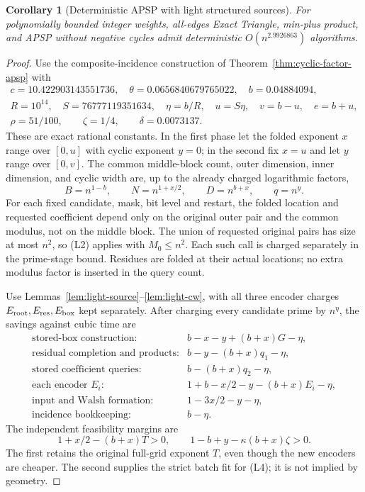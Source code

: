 \documentclass[11pt]{article}
\newtheorem{corollary}[theorem]{Corollary}
\begin{document}
\begin{corollary}[Deterministic APSP with light structured sources]
\label{cor:light-source-apsp}
For polynomially bounded integer weights, all-edges Exact Triangle,
min-plus product, and APSP without negative cycles admit deterministic
$O(n^{2.9926863})$ algorithms.
\end{corollary}
\begin{proof}
Use the composite-incidence construction of
Theorem~\ref{thm:cyclic-factor-apsp} with
\[
\begin{gathered}
 c=10.422903143551736,\quad \theta=0.0656840679765022,\quad
 b=0.04884094,\\
 R=10^{14},\quad S=76777119351634,\quad
 \eta=b/R,\quad u=S\eta,\quad v=b-u,\quad e=b+u,\\
 \rho=51/100,\qquad \zeta=1/4,\qquad \delta=0.0073137.
\end{gathered}
\]
These are exact rational constants. In the first phase let the
folded exponent $x$ range over $[0,u]$ with cyclic exponent $y=0$;
in the second fix $x=u$ and let $y$ range over $[0,v]$.
The common middle-block count, outer dimension, inner dimension,
and cyclic width are, up to the already charged logarithmic factors,
\[
 B=n^{1-b},\qquad N=n^{1+x/2},\qquad D=n^{b+x},\qquad q=n^y.
\]
For each fixed candidate, mask, bit level and restart, the folded
location and requested coefficient depend only on the original outer
pair and the common modulus, not on the middle block. The union of
requested original pairs has size at most $n^2$, so (L2) applies
with $M_0\le n^2$. Each such call is charged separately in the
prime-stage bound. Residues are folded at their actual locations;
no extra modulus factor is inserted in the query count.

Use Lemmas~\ref{lem:light-source}--\ref{lem:light-cw}, with all
three encoder charges $E_{\rm root},E_{\rm res},E_{\rm box}$ kept
separately. After charging every candidate prime by $n^\eta$,
the savings against cubic time are
\[
\begin{array}{ll}
 \text{stored-box construction:}&b-x-y+(b+x)G-\eta,\\
 \text{residual completion and products:}&b-y-(b+x)q_1-\eta,\\
 \text{stored coefficient queries:}&b-(b+x)q_2-\eta,\\
 \text{each encoder }E_i:&1+b-x/2-y-(b+x)E_i-\eta,\\
 \text{input and Walsh formation:}&1-3x/2-y-\eta,\\
 \text{incidence bookkeeping:}&b-\eta.
\end{array}                                                   \tag{L5}
\]
The independent feasibility margins are
\[
 1+x/2-(b+x)T>0,\qquad
 1-b+y-\kappa(b+x)\zeta>0.                                    \tag{L6}
\]
The first retains the original full-grid exponent $T$, even though
the new encoders are cheaper. The second supplies the strict batch
fit for (L4); it is not implied by geometry.


\end{proof}
\end{document}
